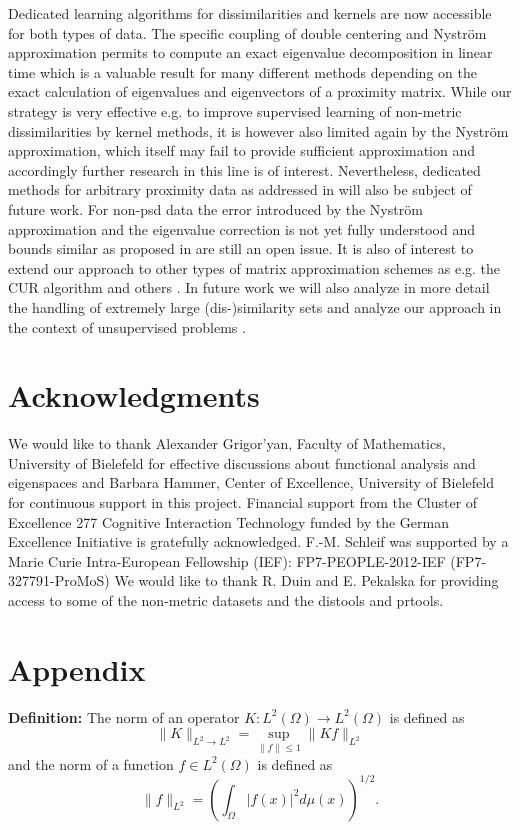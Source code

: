 \documentclass[twoside,11pt]{article}
\begin{document}
Dedicated learning algorithms for dissimilarities and kernels are now accessible for both types of data. 
The specific coupling of double centering and Nystr\"om approximation permits to compute
an exact eigenvalue decomposition in linear time which is a valuable result for many different methods
depending on the exact calculation of eigenvalues and eigenvectors of a proximity matrix. 
While our strategy is very effective e.g. to improve supervised learning of non-metric dissimilarities by kernel methods,
it is however also limited again by the Nystr\"om approximation, which itself may fail to provide sufficient approximation
and accordingly further research in this line is of interest. Nevertheless, dedicated methods for arbitrary proximity data 
as addressed in  \cite{DBLP:conf/sspr/PekalskaDGB04} will also be subject of future work. For non-psd data the error introduced by the Nystr\"om approximation and the eigenvalue correction 
is not yet fully understood and bounds similar as proposed in \cite{DBLP:journals/jmlr/DrineasM05}
are still an open issue. It is also of interest to extend our approach to other types of matrix approximation schemes
as e.g. the CUR algorithm and others \cite{wang2013improving,DBLP:conf/aistats/WangZ14,DBLP:conf/kdd/WangZQZ14}. In future work we will also analyze in more detail the handling of extremely large (dis-)similarity sets 
\cite{Schleif2014e,DBLP:conf/icml/GittensM13} and analyze our approach in the context of unsupervised problems \cite{DBLP:conf/icml/ZhangTK08}.

\section*{Acknowledgments}
We would like to thank Alexander Grigor'yan,  Faculty of Mathematics, 
University of Bielefeld for effective discussions about functional analysis and eigenspaces
and Barbara Hammer, Center of Excellence, University of Bielefeld for continuous support in this project.
Financial support from the Cluster of Excellence 277 Cognitive Interaction Technology 
funded by the German Excellence Initiative is gratefully acknowledged.  F.-M. Schleif was supported by a Marie Curie Intra-European Fellowship (IEF): FP7-PEOPLE-2012-IEF (FP7-327791-ProMoS) 
We would like to thank R. Duin and E. Pekalska for providing access to some of the non-metric datasets and the distools and prtools.

\section{Appendix}
\textbf{Definition:}
The norm of an operator $K:L^2(\Omega) \to L^2(\Omega)$ is defined as
\[
\|K\|_{L^2 \to L^2}=\sup_{\|f\|\leq 1} \|K f\|_{L^2}
\]
and the norm of a function $f\in L^2(\Omega)$ is defined as
\[
\|f\|_{L^2} = \left(\int_\Omega |f(x)|^2 d\mu(x)\right)^{1/2}.
\]
\end{document}
